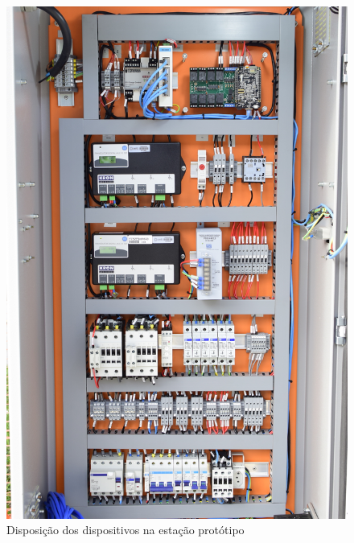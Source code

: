       \begin{figure}[H]
        \begin{center}
          \includegraphics[width=\textwidth,natwidth=1420,natheight=2130]{assets/images/evse-setup.jpg}
          \caption{Disposição dos dispositivos na estação protótipo}
          \label{fig:evse-setup}
        \end{center}
      \end{figure}
